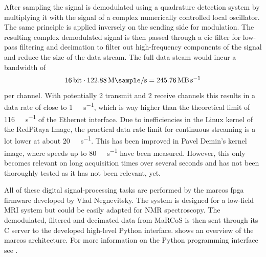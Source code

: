 After sampling the signal is demodulated using a quadrature detection system by multiplying it with the signal of a complex numerically controlled local oscillator. The same principle is applied inversely on the sending side for modulation. The resulting complex demodulated signal is then passed through a \acrfull{cic} filter for low-pass filtering and decimation to filter out high-frequency components of the signal and reduce the size of the data stream. The full data steam would incur a bandwidth of
\[
    \qty{16}{\bit} \cdot \qty{122.88}{\mega\sample\per\second} = \qty{245.76}{\mega\byte\per\second}
\]
per channel. With potentially 2 transmit and 2 receive channels this results in a data rate of close to \qty{1}{\giga\byte\per\second}, which is way higher than the theoretical limit of \qty{116}{\mega\byte\per\second} of the Ethernet interface. Due to inefficiencies in the Linux kernel of the RedPitaya Image, the practical data rate limit for continuous streaming is a lot lower at about \qty{20}{\mega\sample\per\second}. This has been improved in Pavel Demin's kernel image, where speeds up to \qty{80}{\mega\byte\per\second} have been measured. However, this only becomes relevant on long acquisition times over several seconds and has not been thoroughly tested as it has not been relevant, yet.

All of these digital signal-processing tasks are performed by the \acrshort{marcos} \acrshort{fpga} firmware developed by Vlad Negnevitsky. The system is designed for a low-field MRI system but could be easily adapted for NMR spectroscopy. The demodulated, filtered and decimated data from MaRCoS is then sent through its C server to the developed high-level Python interface.  shows an overview of the \acrshort{marcos} architecture. For more information on the Python programming interface see .

